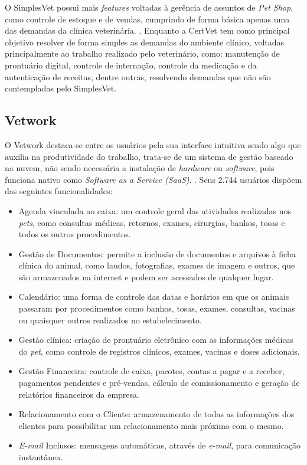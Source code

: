 \documentclass[
    12pt,               %
    openright,          %
    oneside,
    a4paper,            %
    BIBLATEX,           %
    TODO,               %
    english,            %
    brazil              %
    ]{ifsp-spo-inf-ctds}
\begin{document}
    O SimplesVet possui mais \emph{features} voltadas à gerência de assuntos de \emph{Pet Shop}, como controle de estoque e de vendas, cumprindo de forma básica apenas uma das demandas da clínica veterinária.  . Enquanto a CertVet tem como principal objetivo resolver de forma simples as demandas do ambiente clínico, voltadas principalmente ao trabalho realizado pelo veterinário, como: manutenção de prontuário digital, controle de internação, controle da medicação e da autenticação de receitas, dentre outras, resolvendo demandas que não são contempladas pelo SimplesVet.

        \subsection{Vetwork}
        O Vetwork destaca-se entre os usuários pela sua interface intuitiva sendo algo que auxilia na produtividade do trabalho, trata-se de um sistema de gestão baseado na nuvem, não sendo necessária a instalação de \emph{hardware} ou \emph{software}, pois funciona nativo como \emph{Software as a Service (SaaS)}. . Seus 2.744 usuários dispõem das seguintes funcionalidades:

\begin{itemize}
    \item Agenda vinculada ao caixa: um controle geral das atividades realizadas nos \emph{pets}, como consultas médicas, retornos, exames, cirurgias, banhos, tosas e todos os outros procedimentos.
    \item Gestão de Documentos: permite a inclusão de documentos e arquivos à ficha clínica do animal, como laudos, fotografias, exames de imagem e outros, que são armazenados na internet e podem ser acessados de qualquer lugar.
    \item Calendário: uma forma de controle das datas e horários em que os animais passaram por procedimentos como banhos, tosas, exames, consultas, vacinas ou quaisquer outros realizados no estabelecimento.
    \item Gestão clínica: criação de prontuário eletrônico com as informações médicas do \emph{pet}, como controle de registros clínicos, exames, vacinas e doses adicionais.
    \item Gestão Financeira: controle de caixa, pacotes, contas a pagar e a receber, pagamentos pendentes e pré-vendas, cálculo de comissionamento e geração de relatórios financeiros da empresa.
    \item Relacionamento com o Cliente: armazenamento de todas as informações dos clientes para possibilitar um relacionamento mais próximo com o mesmo.
    \item \emph{E-mail} Inclusos: mensagens automáticas, através de \emph{e-mail}, para comunicação instantânea.
\end{itemize}
\end{document}
